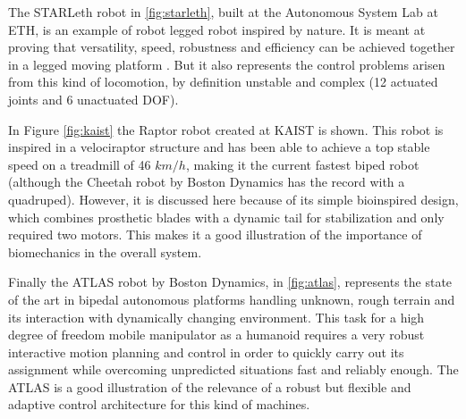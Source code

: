The STARLeth robot in \ref{fig:starleth}, built at the Autonomous System Lab at ETH, is an example of robot legged robot inspired by nature. 
It is meant at proving that versatility, speed, robustness and efficiency can be achieved together in a legged moving platform \cite{starleth}.
But it also represents the control problems arisen from this kind of locomotion, by definition unstable and complex (12 actuated joints and 6 unactuated DOF). 

In Figure \ref{fig:kaist} the Raptor robot created at KAIST is shown.
This robot is inspired in a velociraptor structure and has been able to achieve a top stable speed on a treadmill of 46 $km/h$, making it the current fastest biped robot (although the Cheetah robot by Boston Dynamics has the record with a quadruped).
However, it is discussed here because of its simple bioinspired design, which combines prosthetic blades with a dynamic tail for stabilization and only required two motors.
This makes it a good illustration of the importance of biomechanics in the overall system.

Finally the ATLAS robot by Boston Dynamics, in \ref{fig:atlas}, represents the state of the art in bipedal autonomous platforms handling unknown, rough terrain and its interaction with dynamically changing environment.
This task for a high degree of freedom mobile manipulator as a humanoid requires a very robust interactive motion planning and control in order to quickly carry out its assignment while overcoming unpredicted situations fast and reliably enough.
The ATLAS is a good illustration of the relevance of a robust but flexible and adaptive control architecture for this kind of machines.


